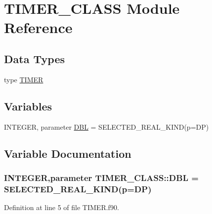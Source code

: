 \hypertarget{namespaceTIMER__CLASS}{
\section{TIMER\_\-CLASS Module Reference}
\label{namespaceTIMER__CLASS}
}
\subsection*{Data Types}
\begin{DoxyCompactItemize}
\item 
type \hyperlink{typeTIMER__CLASS_1_1TIMER}{TIMER}
\end{DoxyCompactItemize}
\subsection*{Variables}
\begin{DoxyCompactItemize}
\item 
INTEGER, parameter \hyperlink{namespaceTIMER__CLASS_aad0658ec4217d15cb973a454db271c59}{DBL} = SELECTED\_\-REAL\_\-KIND(p=DP)
\end{DoxyCompactItemize}


\subsection{Variable Documentation}
\hypertarget{namespaceTIMER__CLASS_aad0658ec4217d15cb973a454db271c59}{
\subsubsection[{DBL}]{\setlength{\rightskip}{0pt plus 5cm}INTEGER,parameter {\bf TIMER\_\-CLASS::DBL} = SELECTED\_\-REAL\_\-KIND(p=DP)}}
\label{namespaceTIMER__CLASS_aad0658ec4217d15cb973a454db271c59}


Definition at line 5 of file TIMER.f90.

